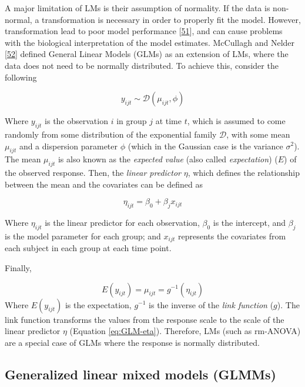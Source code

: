 \documentclass[
]{article}
\begin{document}
A major limitation of LMs is their assumption of normality. If the data is non-normal, a transformation is necessary in order to properly fit the model. However, transformation lead to poor model performance {[}\protect\hyperlink{ref-ohara2010}{51}{]}, and can cause problems with the biological interpretation of the model estimates. McCullagh and Nelder {[}\protect\hyperlink{ref-nelder1972}{52}{]} defined General Linear Models (GLMs) as an extension of LMs, where the data does not need to be normally distributed. To achieve this, consider the following

\begin{equation}
y_{ijt} \sim \mathcal{D}(\mu_{ijt},\phi)
\label{eq:GLM-y}
\end{equation}

Where \(y_{ijt}\) is the observation \(i\) in group \(j\) at time \(t\), which is assumed to come randomly from some distribution of the exponential family \(\mathcal{D}\), with some mean \(\mu_{ijt}\) and a dispersion parameter \(\phi\) (which in the Gaussian case is the variance \(\sigma^{2}\)). The mean \(\mu_{ijt}\) is also known as the \emph{expected value} (also called \emph{expectation}) (\(E\)) of the observed response. Then, the \emph{linear predictor} \(\eta\), which defines the relationship between the mean and the covariates can be defined as

\begin{equation}
\eta_{ijt}=\beta_0+\beta_{j}x_{ijt}
\label{eq:GLM-eta}
\end{equation}

Where \(\eta_{ijt}\) is the linear predictor for each observation, \(\beta_0\) is the intercept, and \(\beta_{j}\) is the model parameter for each group; and \(x_{ijt}\) represents the covariates from each subject in each group at each time point.

Finally,

\begin{equation}
E(y_{ijt})=\mu_{ijt}=g^{-1}(\eta_{ijt})
\label{eq:GLM-Expectation}
\end{equation}
Where \(E(y_{ijt})\) is the expectation, \(g^{-1}\) is the inverse of the \emph{link function} (\(g\)). The link function transforms the values from the response scale to the scale of the linear predictor \(\eta\) (Equation \eqref{eq:GLM-eta}). Therefore, LMs (such as rm-ANOVA) are a special case of GLMs where the response is normally distributed.

\hypertarget{generalized-linear-mixed-models-glmms}{%
\subsection{Generalized linear mixed models (GLMMs)}\label{generalized-linear-mixed-models-glmms}}
\end{document}
